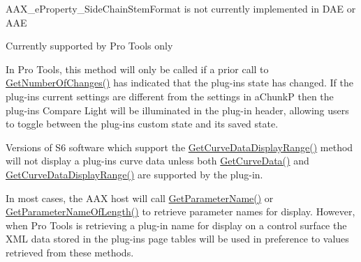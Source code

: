 \begin{DoxyRefList}
A\+A\+X\+\_\+e\+Property\+\_\+\+Side\+Chain\+Stem\+Format is not currently implemented in D\+A\+E or A\+A\+E  
\item[\label{a00381__compatibility_notes000067}%
\hypertarget{a00381__compatibility_notes000067}{}%
global\+Scope$>$ Member \hyperlink{a00283_a6571f4e41a5dd06e4067249228e2249eaf48412738dcfcc56046718d9e5a034d7}{A\+A\+X\+\_\+e\+Property\+\_\+\+Uses\+Client\+G\+U\+I} ]Currently supported by Pro Tools only 
\item[\label{a00381__compatibility_notes000049}%
\hypertarget{a00381__compatibility_notes000049}{}%
Member \hyperlink{a00061_a1e86f849e970c9998313fc7d451ccf85}{A\+A\+X\+\_\+\+I\+A\+C\+F\+Effect\+Parameters\+:\+:Compare\+Active\+Chunk} (const \hyperlink{a00125}{A\+A\+X\+\_\+\+S\+Plug\+In\+Chunk} $\ast$i\+Chunk\+P, A\+A\+X\+\_\+\+C\+Boolean $\ast$o\+Is\+Equal) const =0]In Pro Tools, this method will only be called if a prior call to \hyperlink{a00061_a17b96da201d9a242d3662e87525a7227}{Get\+Number\+Of\+Changes()} has indicated that the plug-\/in\textquotesingle{}s state has changed. If the plug-\/in\textquotesingle{}s current settings are different from the settings in {\ttfamily a\+Chunk\+P} then the plug-\/in\textquotesingle{}s Compare Light will be illuminated in the plug-\/in header, allowing users to toggle between the plug-\/in\textquotesingle{}s custom state and its saved state. 
\item[\label{a00381__compatibility_notes000050}%
\hypertarget{a00381__compatibility_notes000050}{}%
Member \hyperlink{a00342_gaa85bda4027342eb644a9c92a17da6d49}{A\+A\+X\+\_\+\+I\+A\+C\+F\+Effect\+Parameters\+:\+:Get\+Curve\+Data} (A\+A\+X\+\_\+\+C\+Type\+I\+D i\+Curve\+Type, const float $\ast$i\+Values, uint32\+\_\+t i\+Num\+Values, float $\ast$o\+Values) const =0]Versions of S6 software which support the \hyperlink{a00342_ga38d1ac0c15a7052904077ef0e2527e0d}{Get\+Curve\+Data\+Display\+Range()} method will not display a plug-\/in\textquotesingle{}s curve data unless both \hyperlink{a00342_gaa85bda4027342eb644a9c92a17da6d49}{Get\+Curve\+Data()} and \hyperlink{a00342_ga38d1ac0c15a7052904077ef0e2527e0d}{Get\+Curve\+Data\+Display\+Range()} are supported by the plug-\/in. 
\item[\label{a00381__compatibility_notes000048}%
\hypertarget{a00381__compatibility_notes000048}{}%
Member \hyperlink{a00061_a5d556ae1fa4617a6439ef347139d70eb}{A\+A\+X\+\_\+\+I\+A\+C\+F\+Effect\+Parameters\+:\+:Get\+Parameter\+Name\+Of\+Length} (A\+A\+X\+\_\+\+C\+Param\+I\+D i\+Parameter\+I\+D, \hyperlink{a00113}{A\+A\+X\+\_\+\+I\+String} $\ast$o\+Name, int32\+\_\+t i\+Name\+Length) const =0]In most cases, the A\+A\+X host will call \hyperlink{a00061_a8f8ae4b4346e708ec6de612ef99e5a92}{Get\+Parameter\+Name()} or \hyperlink{a00061_a5d556ae1fa4617a6439ef347139d70eb}{Get\+Parameter\+Name\+Of\+Length()} to retrieve parameter names for display. However, when Pro Tools is retrieving a plug-\/in name for display on a control surface the X\+M\+L data stored in the plug-\/in\textquotesingle{}s page tables will be used in preference to values retrieved from these methods. 

\end{DoxyRefList}
